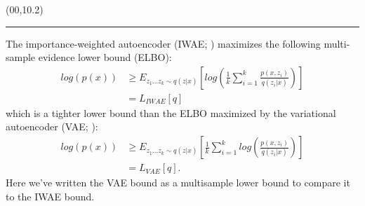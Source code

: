 \documentclass{article}
\newcommand{\eqname}[1]{\tag*{#1}}
\def\CHead#1{\begin{center}\noindent{\LARGE\color{DarkBlue} #1}\end{center}}
\renewcommand{\LARGE}{\fontsize{43}{54}\selectfont}
\begin{document}
\begin{textblock}{10}(00,10.2)
\CHead{Background} 
\hrule
\vspace{3mm}
The importance-weighted autoencoder (IWAE; \cite{burda2015importance}) maximizes the following multi-sample evidence lower bound (ELBO): 
\begin{align} 
    log(p(x)) & \geq E_{z_{1}...z_{k} \sim q(z|x)} \left[log\left(  \frac{1}{k}  \sum_{i=1}^k \frac{p(x,z_i)}{q(z_i|x)}  \right)  \right]  \nonumber \\
    &= L_{IWAE}[q] \nonumber %
\end{align}
which is a tighter lower bound than the ELBO maximized by the variational autoencoder (VAE; \cite{vae}):
\begin{align}
    log(p(x)) & \geq E_{z_{1}...z_{k} \sim q(z|x)} \left[  \frac{1}{k}\sum_{i=1}^k log\left(\frac{p(x,z_i)}{q(z_i|x)}  \right)  \right]  \nonumber \\
    &= L_{VAE}[q]. \nonumber %
\end{align}
Here we've written the VAE bound as a multisample lower bound to compare it to the IWAE bound. 

\end{textblock}
\end{document}
